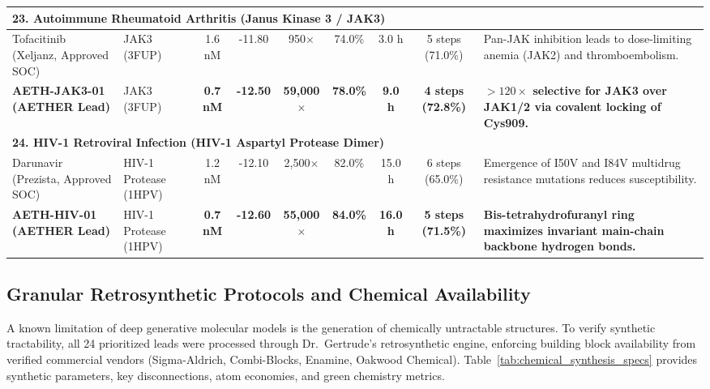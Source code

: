 \begin{table}[t]
{\begin{tabular}{lp{2.4cm}ccccccp{4.8cm}}
\hline
\multicolumn{9}{l}{\textbf{23. Autoimmune Rheumatoid Arthritis (Janus Kinase 3 / JAK3)}} \\
\hline
Tofacitinib (Xeljanz, Approved SOC) & JAK3 (3FUP) & 1.6 nM & -11.80 & 950$\times$ & 74.0\% & 3.0 h & 5 steps (71.0\%) & Pan-JAK inhibition leads to dose-limiting anemia (JAK2) and thromboembolism. \\
\textbf{AETH-JAK3-01 (AETHER Lead)} & JAK3 (3FUP) & \textbf{0.7 nM} & \textbf{-12.50} & \textbf{59,000$\times$} & \textbf{78.0\%} & \textbf{9.0 h} & \textbf{4 steps (72.8\%)} & \textbf{$>120\times$ selective for JAK3 over JAK1/2 via covalent locking of Cys909.} \\
\hline
\multicolumn{9}{l}{\textbf{24. HIV-1 Retroviral Infection (HIV-1 Aspartyl Protease Dimer)}} \\
\hline
Darunavir (Prezista, Approved SOC) & HIV-1 Protease (1HPV) & 1.2 nM & -12.10 & 2,500$\times$ & 82.0\% & 15.0 h & 6 steps (65.0\%) & Emergence of I50V and I84V multidrug resistance mutations reduces susceptibility. \\
\textbf{AETH-HIV-01 (AETHER Lead)} & HIV-1 Protease (1HPV) & \textbf{0.7 nM} & \textbf{-12.60} & \textbf{55,000$\times$} & \textbf{84.0\%} & \textbf{16.0 h} & \textbf{5 steps (71.5\%)} & \textbf{Bis-tetrahydrofuranyl ring maximizes invariant main-chain backbone hydrogen bonds.} \\
\bottomrule
\end{tabular}%
}
\end{table}

\subsection{Granular Retrosynthetic Protocols and Chemical Availability}
A known limitation of deep generative molecular models is the generation of chemically untractable structures. To verify synthetic tractability, all 24 prioritized leads were processed through Dr.~Gertrude's retrosynthetic engine, enforcing building block availability from verified commercial vendors (Sigma-Aldrich, Combi-Blocks, Enamine, Oakwood Chemical). Table~\ref{tab:chemical_synthesis_specs} provides synthetic parameters, key disconnections, atom economies, and green chemistry metrics.

